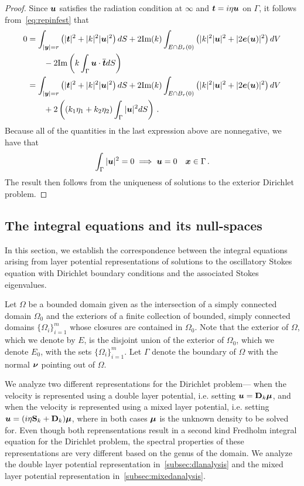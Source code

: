 \begin{proof}
Since ${\boldsymbol u}$ satisfies the radiation condition at $\infty$ and ${\boldsymbol t} = i\eta {\boldsymbol u}$
on $\Gamma$, it follows from~\cref{eq:repinfest} that
\begin{align*}
0 &=
\int_{|{\boldsymbol y}|=r} \left( |{\boldsymbol t}|^2 + |k|^2 |{\boldsymbol u}|^2 \right) dS +
2 \text{Im}(k) \int_{E \cap B_{r}(0)} \left(|k|^2 |{\boldsymbol u}|^2 + |2{\boldsymbol e}({\boldsymbol u})|^2 \right)
dV \nonumber \\
& \qquad - 2 \text{Im} \left( k \int_{\Gamma} {\boldsymbol u} \cdot \overline{{\boldsymbol t}} dS  \right) \\
&= 
\int_{|{\boldsymbol y}|=r} \left( |{\boldsymbol t}|^2 + |k|^2 |{\boldsymbol u}|^2 \right) dS +
2 \text{Im}(k) \int_{E \cap B_{r}(0)} \left(|k|^2 |{\boldsymbol u}|^2 + |2{\boldsymbol e}({\boldsymbol u})|^2 \right)
dV \nonumber \\
& \qquad + 2 \left( (k_{1}\eta_{1} + k_{2}\eta_{2}) \int_{\Gamma} |{\boldsymbol u}|^{2} dS  \right)
\, .
\end{align*}
Because all of the quantities in the last expression above are
nonnegative, we have that
\begin{equation}
  \int_{\Gamma} |{\boldsymbol u}|^{2} = 0 \implies {\boldsymbol u} = 0  \quad {\boldsymbol x} \in \Gamma \, .
  \nonumber
\end{equation}
The result then follows from the uniqueness of solutions to the exterior
Dirichlet problem.
\end{proof}

\subsection{The integral equations and its null-spaces}

In this section, we establish the correspondence between the
integral equations arising from layer potential representations
of solutions to the oscillatory Stokes equation with Dirichlet 
boundary conditions and the associated Stokes eigenvalues.

Let $\Omega$ be a bounded domain given as
the intersection of a simply connected domain $\Omega_0$ and
the exteriors of a finite collection of bounded,
simply connected domains $\{ \Omega_i \}_{i=1}^m$
whose closures are contained in $\Omega_0$. Note that the
exterior of $\Omega$, which we denote by $E$, is the
disjoint union of the exterior of $\Omega_0$, which we
denote $E_0$, with the sets $\{ \Omega_i \}_{i=1}^m$.
Let $\Gamma$ denote the boundary of $\Omega$ with the normal
${\boldsymbol \nu}$ pointing out of $\Omega$.

We analyze two different representations for the Dirichlet problem---
when the velocity is represented using a double layer potential,
i.e. setting ${\boldsymbol u}={\bf D}_{k} {\boldsymbol \mu}$, and when the velocity
is represented using a mixed layer potential,
i.e. setting ${\boldsymbol u}=(i\eta {\bf S}_{k} + {\bf D}_{k}){\boldsymbol \mu}$, where in both cases ${\boldsymbol \mu}$ 
is the unknown density to be solved for. 
Even though both reprensentations result in a second kind
Fredholm integral equation for the Dirichlet problem,
the spectral properties of these representations are very
different based on the genus of the domain.
We analyze the double layer potential representation 
in~\cref{subsec:dlanalysis}
and the mixed layer potential representation in~\cref{subsec:mixedanalysis}.

